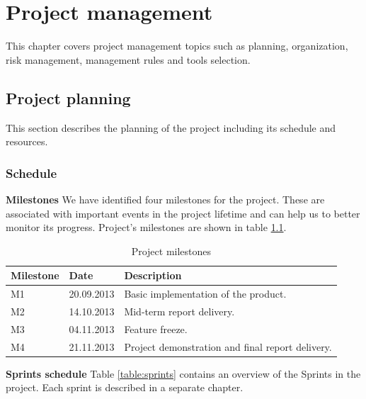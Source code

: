 \chapter{Project management}

\label{ch:management}
\nocite{Sommerville9}

This chapter covers project management topics such as planning, organization, risk management,
management rules and tools selection.

\section{Project planning}
\label{section:planning}
This section describes the planning of the project including its schedule and resources.

\subsection{Schedule}
\label{section:schedule}

\textbf{Milestones} \newline
We have identified four milestones for the project. These are associated with important events in the project lifetime
and can help us to better monitor its progress. Project's milestones are shown in table \ref{table:milestones}.

\begin{table}[h]
\begin{center}
\begin{tabular}{ | l | l | l | }
  \hline
  Milestone & Date & Description \\
  \hline\noalign{\smallskip}\hline
  M1 & 20.09.2013 & Basic implementation of the product. \\
  M2 & 14.10.2013 & Mid-term report delivery. \\
  M3 & 04.11.2013 & Feature freeze. \\
  M4 & 21.11.2013 & Project demonstration and final report delivery. \\
  \hline
\end{tabular}
\end{center}
\caption{Project milestones}
\label{table:milestones}
\end{table}

\textbf{Sprints schedule} \newline
Table \ref{table:sprints} contains an overview of the Sprints in the project.
Each sprint is described in a separate chapter.

